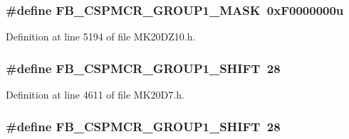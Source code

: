 \subsubsection[{\texorpdfstring{F\+B\+\_\+\+C\+S\+P\+M\+C\+R\+\_\+\+G\+R\+O\+U\+P1\+\_\+\+M\+A\+SK}{FB_CSPMCR_GROUP1_MASK}}]{\setlength{\rightskip}{0pt plus 5cm}\#define F\+B\+\_\+\+C\+S\+P\+M\+C\+R\+\_\+\+G\+R\+O\+U\+P1\+\_\+\+M\+A\+SK~0x\+F0000000u}\hypertarget{group___f_b___register___masks_ga735fd2a0040e9ad1122a3c3fc8e28193}{}\label{group___f_b___register___masks_ga735fd2a0040e9ad1122a3c3fc8e28193}


Definition at line 5194 of file M\+K20\+D\+Z10.\+h.

\subsubsection[{\texorpdfstring{F\+B\+\_\+\+C\+S\+P\+M\+C\+R\+\_\+\+G\+R\+O\+U\+P1\+\_\+\+S\+H\+I\+FT}{FB_CSPMCR_GROUP1_SHIFT}}]{\setlength{\rightskip}{0pt plus 5cm}\#define F\+B\+\_\+\+C\+S\+P\+M\+C\+R\+\_\+\+G\+R\+O\+U\+P1\+\_\+\+S\+H\+I\+FT~28}\hypertarget{group___f_b___register___masks_ga9c83850dcb3efe92a0404101e5afbdca}{}\label{group___f_b___register___masks_ga9c83850dcb3efe92a0404101e5afbdca}


Definition at line 4611 of file M\+K20\+D7.\+h.

\subsubsection[{\texorpdfstring{F\+B\+\_\+\+C\+S\+P\+M\+C\+R\+\_\+\+G\+R\+O\+U\+P1\+\_\+\+S\+H\+I\+FT}{FB_CSPMCR_GROUP1_SHIFT}}]{\setlength{\rightskip}{0pt plus 5cm}\#define F\+B\+\_\+\+C\+S\+P\+M\+C\+R\+\_\+\+G\+R\+O\+U\+P1\+\_\+\+S\+H\+I\+FT~28}\hypertarget{group___f_b___register___masks_ga9c83850dcb3efe92a0404101e5afbdca}{}\label{group___f_b___register___masks_ga9c83850dcb3efe92a0404101e5afbdca}


